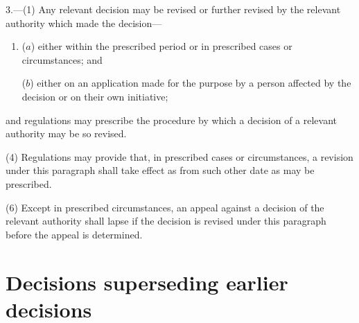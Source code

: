 \documentclass[12pt,a4paper]{article}
\begin{document}
3.---(1) Any relevant decision may be revised or further revised by the relevant authority which made the decision—
\begin{enumerate}\item[]
($a$) either within the prescribed period or in prescribed cases or circumstances; and

($b$) either on an application made for the purpose by a person affected by the decision or on their own initiative;
\end{enumerate}
and regulations may prescribe the procedure by which a decision of a relevant authority may be so revised.

%

(4) Regulations may provide that, in prescribed cases or circumstances, a revision under this paragraph shall take effect as from such other date as may be prescribed.


(6) Except in prescribed circumstances, an appeal against a decision of the relevant authority shall lapse if the decision is revised under this paragraph before the appeal is determined.


\section*{Decisions superseding earlier decisions}
\end{document}
